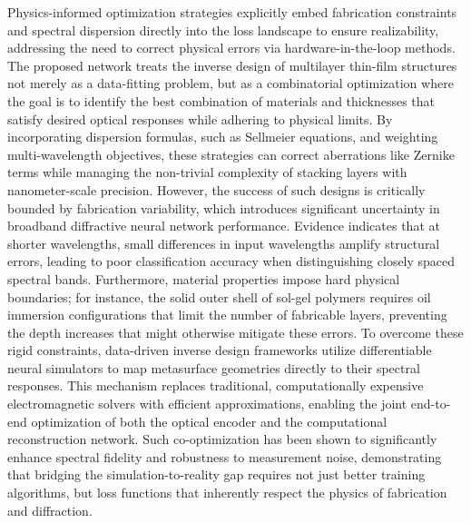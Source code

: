 Physics-informed optimization strategies explicitly embed fabrication constraints and spectral dispersion directly into the loss landscape to ensure realizability, addressing the need to correct physical errors via hardware-in-the-loop methods. The proposed network treats the inverse design of multilayer thin-film structures not merely as a data-fitting problem, but as a combinatorial optimization where the goal is to identify the best combination of materials and thicknesses that satisfy desired optical responses while adhering to physical limits. By incorporating dispersion formulas, such as Sellmeier equations, and weighting multi-wavelength objectives, these strategies can correct aberrations like Zernike terms while managing the non-trivial complexity of stacking layers with nanometer-scale precision. However, the success of such designs is critically bounded by fabrication variability, which introduces significant uncertainty in broadband diffractive neural network performance. Evidence indicates that at shorter wavelengths, small differences in input wavelengths amplify structural errors, leading to poor classification accuracy when distinguishing closely spaced spectral bands. Furthermore, material properties impose hard physical boundaries; for instance, the solid outer shell of sol-gel polymers requires oil immersion configurations that limit the number of fabricable layers, preventing the depth increases that might otherwise mitigate these errors. To overcome these rigid constraints, data-driven inverse design frameworks utilize differentiable neural simulators to map metasurface geometries directly to their spectral responses. This mechanism replaces traditional, computationally expensive electromagnetic solvers with efficient approximations, enabling the joint end-to-end optimization of both the optical encoder and the computational reconstruction network. \citep{s2_76a83ea3baed75ad88b7f0782eb9a694a330c853_cee16cac} \citep{doi_10_1002_admt_202401999_652aff4b} Such co-optimization has been shown to significantly enhance spectral fidelity and robustness to measurement noise, demonstrating that bridging the simulation-to-reality gap requires not just better training algorithms, but loss functions that inherently respect the physics of fabrication and diffraction. \citep{doi_10_1016_j_isci_2025_112222_1f7c10f5} \citep{doi_10_1002_adpr_202300310_6647aa64} \citep{s2_76a83ea3baed75ad88b7f0782eb9a694a330c853_cee16cac}

